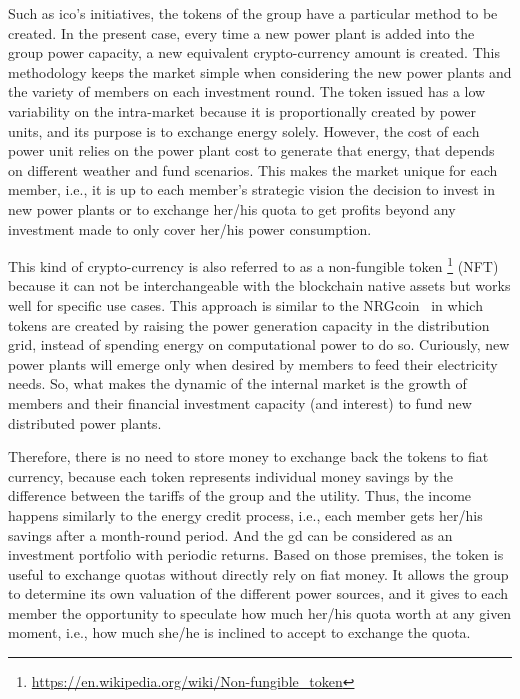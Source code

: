 Such as \gls{ico}'s initiatives, the tokens of the group have a particular method to be created.
In the present case, every time a new power plant is added into the group power capacity, a new equivalent crypto-currency amount is created.
This methodology keeps the market simple when considering the new power plants and the variety of members on each investment round.
The token issued has a low variability on the intra-market because it is proportionally created by power units, and its purpose is to exchange energy solely.
However, the cost of each power unit relies on the power plant cost to generate that energy, that depends on different weather and fund scenarios.
This makes the market unique for each member, i.e., it is up to each member's strategic vision the decision to invest in new power plants or to exchange her/his quota to get profits beyond any investment made to only cover her/his power consumption.

This kind of crypto-currency is also referred to as a non-fungible token%
\footnote{\url{https://en.wikipedia.org/wiki/Non-fungible_token}} (NFT)
because it can not be interchangeable with the blockchain native assets but works well for specific use cases.
This approach is similar to the NRGcoin~\cite{mihaylov2014} in which tokens are created by raising the power generation capacity in the distribution grid, instead of spending energy on computational power to do so.
Curiously, new power plants will emerge only when desired by members to feed their electricity needs.
So, what makes the dynamic of the internal market is the growth of members and their financial investment capacity (and interest) to fund new distributed power plants.

Therefore, there is no need to store money to exchange back the tokens to fiat currency, because each token represents individual money savings by the difference between the tariffs of the group and the utility.
Thus, the income happens similarly to the energy credit process, i.e., each member gets her/his savings after a month-round period.
And the \gls{gd} can be considered as an investment portfolio with periodic returns.
Based on those premises, the token is useful to exchange quotas without directly rely on fiat money.
It allows the group to determine its own valuation of the different power sources,
and it gives to each member the opportunity to speculate how much her/his quota worth at any given moment, i.e., how much she/he is inclined to accept to exchange the quota.

